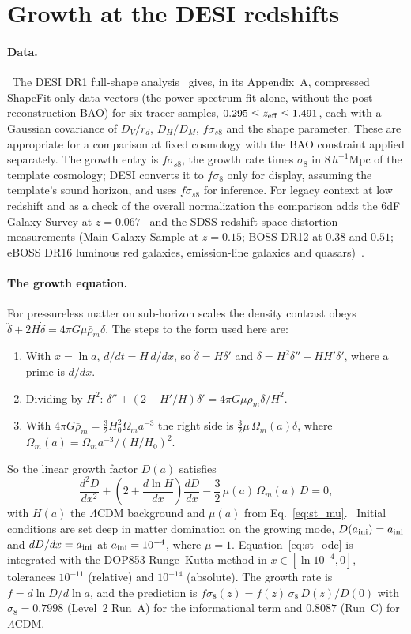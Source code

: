 \section{Growth at the DESI redshifts}\label{sec:st_growth}
\paragraph{Data.} \observed\ The DESI DR1 full-shape analysis~\cite{DESI2024V} gives, in its Appendix~A, compressed ShapeFit-only data vectors (the
power-spectrum fit alone, without the post-reconstruction BAO) for six tracer samples, $0.295\le z_{\rm eff}\le1.491$, each with a Gaussian covariance of
$D_V/r_d$, $D_H/D_M$, $f\sigma_{s8}$ and the shape parameter. These are appropriate for a comparison at fixed cosmology with the BAO constraint applied
separately. The growth entry is $f\sigma_{s8}$, the growth rate times $\sigma_8$ in $8\,h^{-1}$Mpc of the template cosmology; DESI converts it to
$f\sigma_8$ only for display, assuming the template's sound horizon, and uses $f\sigma_{s8}$ for inference. For legacy context at low redshift and as a
check of the overall normalization the comparison adds the 6dF Galaxy Survey at $z=0.067$~\cite{Beutler2012} and the SDSS redshift-space-distortion
measurements (Main Galaxy Sample at $z=0.15$; BOSS DR12 at $0.38$ and $0.51$; eBOSS DR16 luminous red galaxies, emission-line galaxies and
quasars)~\cite{Alam2021}.

\paragraph{The growth equation.} For pressureless matter on sub-horizon scales the density contrast obeys
$\ddot\delta+2H\dot\delta=4\pi G\mu\bar\rho_m\delta$. The steps to the form used here are:
\begin{enumerate}
\item With $x=\ln a$, $d/dt=H\,d/dx$, so $\dot\delta=H\delta'$ and $\ddot\delta=H^2\delta''+HH'\delta'$, where a prime is $d/dx$.
\item Dividing by $H^2$: $\delta''+(2+H'/H)\delta'=4\pi G\mu\bar\rho_m\delta/H^2$.
\item With $4\pi G\bar\rho_m=\tfrac32H_0^2\Omega_ma^{-3}$ the right side is $\tfrac32\mu\,\Omega_m(a)\delta$, where $\Omega_m(a)=\Omega_ma^{-3}/(H/H_0)^2$.
\end{enumerate}
So the linear growth factor $D(a)$ satisfies
\begin{equation}
\frac{d^2D}{dx^2}+\left(2+\frac{d\ln H}{dx}\right)\frac{dD}{dx}-\frac32\,\mu(a)\,\Omega_m(a)\,D=0,
\label{eq:st_ode}\end{equation}
with $H(a)$ the $\Lambda$CDM background and $\mu(a)$ from Eq.~\eqref{eq:st_mu}. \derived\ Initial conditions are set deep in matter domination on the
growing mode, $D(a_{\rm ini})=a_{\rm ini}$ and $dD/dx=a_{\rm ini}$ at $a_{\rm ini}=10^{-4}$, where $\mu=1$. Equation~\eqref{eq:st_ode} is integrated with
the DOP853 Runge--Kutta method in $x\in[\ln10^{-4},0]$, tolerances $10^{-11}$ (relative) and $10^{-14}$ (absolute). The growth rate is $f=d\ln D/d\ln a$,
and the prediction is $f\sigma_8(z)=f(z)\,\sigma_8\,D(z)/D(0)$ with $\sigma_8=0.7998$ (Level~2 Run~A) for the informational term and $0.8087$ (Run~C) for
$\Lambda$CDM.

